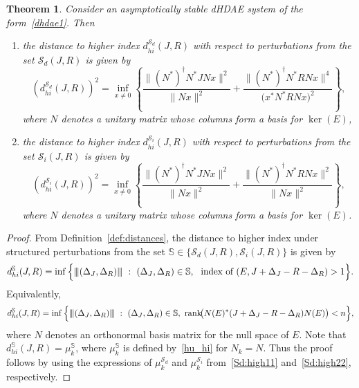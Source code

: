 \documentclass[11pt]{article}
\newtheorem{theorem}{Theorem}
\newcommand{\nnrm}[1]{{\left\vert\kern-0.25ex\left\vert\kern-0.25ex\left\vert #1
		\right\vert\kern-0.25ex\right\vert\kern-0.25ex\right\vert}}
\begin{document}
\begin{theorem}\label{thm:dist-hiJR}
    Consider an asymptotically stable dHDAE system of the form~\eqref{dhdae1}. Then
    \begin{enumerate}
        \item the distance to higher index $d_{hi}^{\mathcal S_d}(J,R)$ with respect to perturbations from the set $\mathcal S_{d}(J,R)$ is given by
        \begin{equation}
            (d_{hi}^{\mathcal S_d}(J,R))^2 = \inf_{x\neq 0} \left\{\frac{\|(N^*)^{\dagger} N^* J N x\|^2}{\|N x\|^2} + \frac{\|(N^*)^{\dagger} N^* R N x\|^4} {\big(x^* N^* R N x\big)^2} \right\},
        \end{equation}
        where $N$ denotes a unitary  matrix whose columns form a basis for $\ker(E)$,
        \item the distance to higher index $d_{hi}^{\mathcal S_i}(J,R)$ with respect to perturbations from the set $\mathcal S_{i}(J,R)$ is given by
        \begin{equation}
            (d_{hi}^{\mathcal S_i}(J,R))^2 = \inf_{x\neq 0} \left\{ \frac{\|(N^*)^{\dagger} N^* J N x\|^2}{\|N x\|^2} + \frac{\|(N^*)^{\dagger} N^* R N x\|^2} {\|N x\|^2} \right\},
        \end{equation}
        where $N$ denotes a unitary matrix whose columns form a basis for $\ker(E)$.
    \end{enumerate}
\end{theorem}
\begin{proof}
    From Definition~\eqref{def:distances}, the distance to higher index under structured perturbations from the set $\mathbb S\in \{\mathcal S_d(J,R),\mathcal S_i(J,R)\}$ is given by
    \[
    d_{hi}^{\mathbb S}(J,R) = \inf\Big\{\nnrm{(\Delta_J,\Delta_R)} ~:~ (\Delta_J,\Delta_R)\in \mathbb S,~ \text{ index of } (E,J+\Delta_J-R-\Delta_R) > 1 \Big\}.
    \]
    Equivalently,
    \begin{equation*}
        d_{hi}^{\mathbb S}(J,R) = \inf\Big\{ \nnrm{(\Delta_J,\Delta_R)} ~:~ (\Delta_J,\Delta_R)\in \mathbb S,~ \text{rank}\!\big(N(E)^* (J+\Delta_J-R-\Delta_R) N(E) \big) < n \Big\},
    \end{equation*}
    where $N$ denotes an orthonormal basis matrix for the null space of $E$.
%
    Note that $d_{hi}^{\mathbb S}(J,R)=\mu_k^{\mathbb S}$, where $\mu_k^{\mathbb S}$ is defined by~\eqref{hu_hi} for $N_k=N$. Thus the proof follows by using the expressions of $\mu_k^{\mathcal S_d}$ and $\mu_k^{\mathcal S_i}$ from~\eqref{Sd:high11} and~\eqref{Sd:high22}, respectively.\end{proof}
\end{document}
